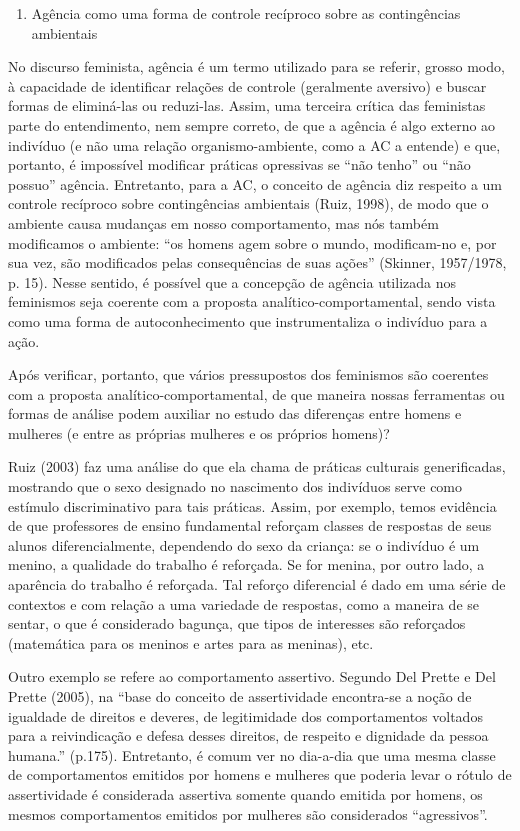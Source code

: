 \begin{enumerate}[resume]
    \item Agência como uma forma de controle recíproco sobre as contingências ambientais
\end{enumerate}

No discurso feminista, agência é um termo utilizado para se referir, grosso modo, à capacidade de identificar relações de controle (geralmente aversivo) e buscar formas de eliminá-las ou reduzi-las. Assim, uma terceira crítica das feministas parte do entendimento, nem sempre correto, de que a agência é algo externo ao indivíduo (e não uma relação organismo-ambiente, como a AC a entende) e que, portanto, é impossível modificar práticas opressivas se ``não tenho'' ou ``não possuo'' agência. Entretanto, para a AC, o conceito de agência diz respeito a um controle recíproco sobre contingências ambientais (Ruiz, 1998), de modo que o ambiente causa mudanças em nosso comportamento, mas nós também modificamos o ambiente: ``os homens agem sobre o mundo, modificam-no e, por sua vez, são modificados pelas consequências de suas ações'' (Skinner, 1957/1978, p. 15). Nesse sentido, é possível que a concepção de agência utilizada nos feminismos seja coerente com a proposta analítico-comportamental, sendo vista como uma forma de autoconhecimento que instrumentaliza o indivíduo para a ação.

Após verificar, portanto, que vários pressupostos dos feminismos são coerentes com a proposta analítico-comportamental, de que maneira nossas ferramentas ou formas de análise podem auxiliar no estudo das diferenças entre homens e mulheres (e entre as próprias mulheres e os próprios homens)?

Ruiz (2003) faz uma análise do que ela chama de práticas culturais generificadas, mostrando que o sexo designado no nascimento dos indivíduos serve como estímulo discriminativo para tais práticas. Assim, por exemplo, temos evidência de que professores de ensino fundamental reforçam classes de respostas de seus alunos diferencialmente, dependendo do sexo da criança: se o indivíduo é um menino, a qualidade do trabalho é reforçada. Se for menina, por outro lado, a aparência do trabalho é reforçada. Tal reforço diferencial é dado em uma série de contextos e com relação a uma variedade de respostas, como a maneira de se sentar, o que é considerado bagunça, que tipos de interesses são reforçados (matemática para os meninos e artes para as meninas), etc. 

Outro exemplo se refere ao comportamento assertivo. Segundo Del Prette e Del Prette (2005), na ``base do conceito de assertividade encontra-se a noção de igualdade de direitos e deveres, de legitimidade dos comportamentos voltados para a reivindicação e defesa desses direitos, de respeito e dignidade da pessoa humana.'' (p.175). Entretanto, é comum ver no dia-a-dia que uma mesma classe de comportamentos emitidos por homens e mulheres que poderia levar o rótulo de assertividade é considerada assertiva somente quando emitida por homens, os mesmos comportamentos emitidos por mulheres são considerados ``agressivos''.

